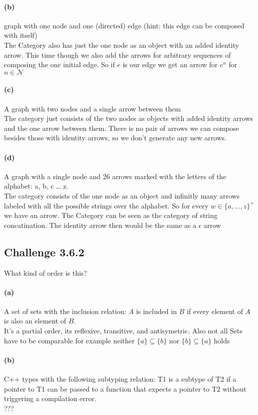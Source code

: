 \documentclass[11pt]{article}
\begin{document}
    \paragraph*{(b)} graph with one node and one (directed) edge (hint: this
    edge can be composed with itself) \\
        The Category also has just the one node as an object with an added identity arrow. This time though we also add the arrows for arbitrary sequences of composing the one initial edge. So if $e$ is our edge we get an arrow for $e^n$ for $n \in \mathcal{N}$
    \paragraph*{(c)} A graph with two nodes and a single arrow between them \\
        The category just consists of the two nodes as objects with added identity arrows and the one arrow between them. There is no pair of arrows we can compose besides those with identity arrows, so we don't generate any new arrows. 
    \paragraph*{(d)} A graph with a single node and 26 arrows marked with the
    letters of the alphabet: a, b, c … z. \\
        The category consists of the one node as an object and infinitly many arrows labeled with all the possible strings over the alphabet. So for every $w \in \{a,...,z\}^+$ we have an arrow. The Category can be seen as the category of string concatination. The identity arrow then would be the same as a $\epsilon$ arrow

    \subsection*{Challenge 3.6.2}
    What kind of order is this? \\
    \paragraph*{(a)} A set of sets with the inclusion relation: $A$ is included in $B$
    if every element of $A$ is also an element of $B$.\\
    It's a partial order, its reflexive, transitive, and antisymetric. Also not all Sets have to be comparable for example neither $\{a\} \subseteq \{b\}$ nor $\{b\} \subseteq \{a\}$ holds
    \paragraph*{(b)} C++ types with the following subtyping relation: T1 is a subtype
    of T2 if a pointer to T1 can be passed to a function that
    expects a pointer to T2 without triggering a compilation error. \\
    ???
\end{document}
